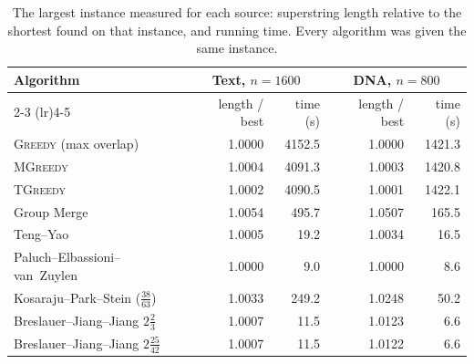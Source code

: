\begin{table}[htbp]
    \centering
    \caption{The largest instance measured for each source: superstring length relative to the shortest found on that instance, and running time. Every algorithm was given the same instance.}
    \label{tab:bench_large_scale}
    \small
    \setlength{\tabcolsep}{6pt}
    \renewcommand{\arraystretch}{1.1}
    \begin{tabular}{@{}lrrrr@{}}
        \toprule
        \textbf{Algorithm} & \multicolumn{2}{c}{\textbf{Text, $n=1600$}} & \multicolumn{2}{c}{\textbf{DNA, $n=800$}} \\
        \cmidrule(lr){2-3} \cmidrule(lr){4-5}
          & length / best & time (s) & length / best & time (s) \\
        \midrule
        \textsc{Greedy} (max overlap) & 1.0000 & 4152.5 & 1.0000 & 1421.3 \\
        \textsc{MGreedy} & 1.0004 & 4091.3 & 1.0003 & 1420.8 \\
        \textsc{TGreedy} & 1.0002 & 4090.5 & 1.0001 & 1422.1 \\
        Group Merge & 1.0054 & 495.7 & 1.0507 & 165.5 \\
        Teng--Yao & 1.0005 & 19.2 & 1.0034 & 16.5 \\
        Paluch--Elbassioni--van~Zuylen & 1.0000 & 9.0 & 1.0000 & 8.6 \\
        Kosaraju--Park--Stein ($\frac{38}{63}$) & 1.0033 & 249.2 & 1.0248 & 50.2 \\
        Breslauer--Jiang--Jiang $2\frac{2}{3}$ & 1.0007 & 11.5 & 1.0123 & 6.6 \\
        Breslauer--Jiang--Jiang $2\frac{25}{42}$ & 1.0007 & 11.5 & 1.0122 & 6.6 \\
        \bottomrule
    \end{tabular}
\end{table}
